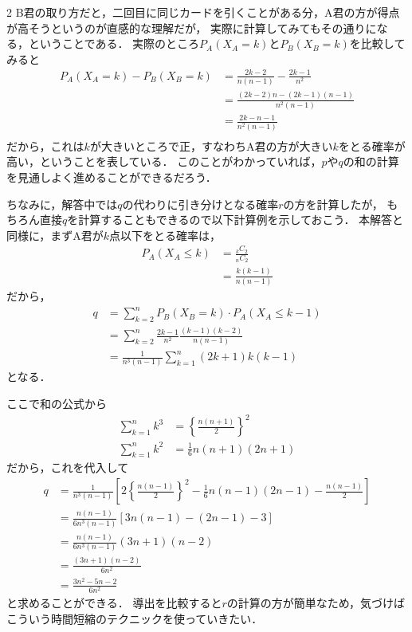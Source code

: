 \documentclass[../../../../main.tex]{subfiles}
\begin{document}
\begin{multicols}{2}
    B君の取り方だと，二回目に同じカードを引くことがある分，A君の方が得点が高そうというのが直感的な理解だが，
    実際に計算してみてもその通りになる，ということである．
    実際のところ$P_A(X_A=k)$と$P_B(X_B=k)$を比較してみると
    \begin{align*}
        P_A(X_A=k)-P_B(X_B=k)
         & = \frac{2k-2}{n(n-1)} - \frac{2k-1}{n^2} \\
         & = \frac{(2k-2)n-(2k-1)(n-1)}{n^2(n-1)}   \\
         & = \frac{2k-n-1}{n^2(n-1)}                \\
    \end{align*}
    だから，これは$k$が大きいところで正，すなわちA君の方が大きい$k$をとる確率が高い，ということを表している．
    このことがわかっていれば，$p$や$q$の和の計算を見通しよく進めることができるだろう．

    ちなみに，解答中では$q$の代わりに引き分けとなる確率$r$の方を計算したが，
    もちろん直接$q$を計算することもできるので以下計算例を示しておこう．
    本解答と同様に，まずA君が$k$点以下をとる確率は，
    \begin{align*}
        P_A(X_A \le k)
         & = \frac{{}_{k}C_2}{{}_nC_2} \\
         & = \frac{k(k-1)}{n(n-1)}
    \end{align*}
    だから，
    \begin{align*}
        q
         & = \sum_{k=2}^n P_B(X_B=k) \cdot P_A(X_A \le k-1)          \\
         & = \sum_{k=2}^n \frac{2k-1}{n^2} \frac{(k-1)(k-2)}{n(n-1)} \\
         & = \frac{1}{n^3(n-1)} \sum_{k=1}^n (2k+1)k(k-1)
    \end{align*}
    となる．

    ここで和の公式から
    \begin{align*}
        \sum_{k=1}^{n} k^3 & = \left\{\frac{n(n+1)}{2}\right\}^2 \\
        \sum_{k=1}^{n} k^2 & = \frac{1}{6}n(n+1)(2n+1)
    \end{align*}
    だから，これを代入して
    \begin{align*}
        q
         & =  \frac{1}{n^3(n-1)} \left[2\left\{\frac{n(n-1)}{2}\right\}^2 - \frac{1}{6}n(n-1)(2n-1) - \frac{n(n-1)}{2}\right] \\
         & =  \frac{n(n-1)}{6n^3(n-1)} \left[3n(n-1) - (2n-1) - 3\right]                                                      \\
         & =  \frac{n(n-1)}{6n^3(n-1)}(3n+1)(n-2)                                                                             \\
         & =  \frac{(3n+1)(n-2)}{6n^2}                                                                                        \\
         & =  \frac{3n^2-5n-2}{6n^2}
    \end{align*}
    と求めることができる．
    導出を比較すると$r$の計算の方が簡単なため，気づけばこういう時間短縮のテクニックを使っていきたい．


\end{multicols}
\end{document}
